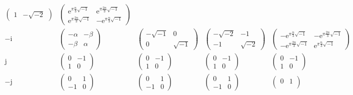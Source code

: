 \documentclass[
]{book}
\theoremstyle{definition}
\theoremstyle{definition}
\theoremstyle{definition}
\theoremstyle{definition}
\theoremstyle{remark}
\begin{document}
\[\begin{array}{ccccc}
\begin{pmatrix}
1 & -\sqrt{-2}
\end{pmatrix} & \begin{pmatrix}\mathrm{e}^{\pi\frac{n}{3}\sqrt{-1}} & \mathrm{e}^{\pi\frac{2n}{3}\sqrt{-1}}\\
\mathrm{e}^{\pi\frac{2n}{3}\sqrt{-1}} & -\mathrm{e}^{\pi\frac{n}{3}\sqrt{-1}}
\end{pmatrix}\\
-\mathrm{i} & \begin{pmatrix}-\alpha & -\beta\\
-\beta & \alpha
\end{pmatrix} & \begin{pmatrix}-\sqrt{-1} & 0\\
0 & \sqrt{-1}
\end{pmatrix} & \begin{pmatrix}-\sqrt{-2} & -1\\
-1 & \sqrt{-2}
\end{pmatrix} & \begin{pmatrix}-\mathrm{e}^{\pi\frac{n}{3}\sqrt{-1}} & -\mathrm{e}^{\pi\frac{2n}{3}\sqrt{-1}}\\
-\mathrm{e}^{\pi\frac{2n}{3}\sqrt{-1}} & \mathrm{e}^{\pi\frac{n}{3}\sqrt{-1}}
\end{pmatrix}\\
\mathrm{j} & \begin{pmatrix}0 & -1\\
1 & 0
\end{pmatrix} & \begin{pmatrix}0 & -1\\
1 & 0
\end{pmatrix} & \begin{pmatrix}0 & -1\\
1 & 0
\end{pmatrix} & \begin{pmatrix}0 & -1\\
1 & 0
\end{pmatrix}\\
-\mathrm{j} & \begin{pmatrix}0 & 1\\
-1 & 0
\end{pmatrix} & \begin{pmatrix}0 & 1\\
-1 & 0
\end{pmatrix} & \begin{pmatrix}0 & 1\\
-1 & 0
\end{pmatrix} & \begin{pmatrix}0 & 1\\

\end{pmatrix}
\end{array}\]
\end{document}
